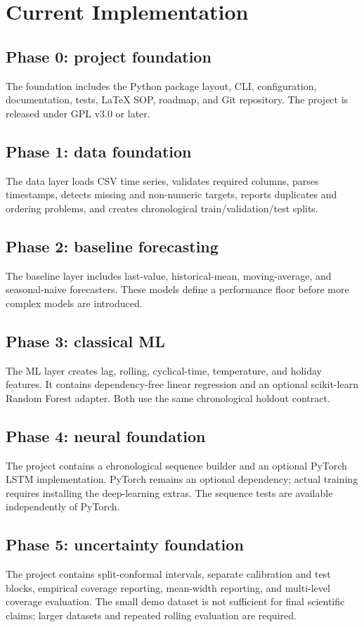 \documentclass[11pt,a4paper]{report}
\begin{document}
\chapter{Current Implementation}
\section{Phase 0: project foundation}
The foundation includes the Python package layout, CLI, configuration, documentation, tests, LaTeX SOP, roadmap, and Git repository. The project is released under GPL v3.0 or later.

\section{Phase 1: data foundation}
The data layer loads CSV time series, validates required columns, parses timestamps, detects missing and non-numeric targets, reports duplicates and ordering problems, and creates chronological train/validation/test splits.

\section{Phase 2: baseline forecasting}
The baseline layer includes last-value, historical-mean, moving-average, and seasonal-naive forecasters. These models define a performance floor before more complex models are introduced.

\section{Phase 3: classical ML}
The ML layer creates lag, rolling, cyclical-time, temperature, and holiday features. It contains dependency-free linear regression and an optional scikit-learn Random Forest adapter. Both use the same chronological holdout contract.

\section{Phase 4: neural foundation}
The project contains a chronological sequence builder and an optional PyTorch LSTM implementation. PyTorch remains an optional dependency; actual training requires installing the deep-learning extras. The sequence tests are available independently of PyTorch.

\section{Phase 5: uncertainty foundation}
The project contains split-conformal intervals, separate calibration and test blocks, empirical coverage reporting, mean-width reporting, and multi-level coverage evaluation. The small demo dataset is not sufficient for final scientific claims; larger datasets and repeated rolling evaluation are required.
\end{document}
